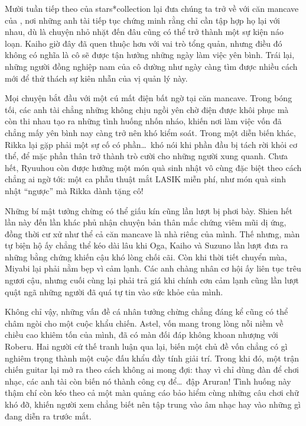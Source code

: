 \documentclass[main.tex]{subfiles}
\begin{document}
\color{black}

Mười tuần tiếp theo của stars*collection lại đưa chúng ta trở về với căn mancave của \hls, nơi những anh tài tiếp tục chứng minh rằng chỉ cần tập hợp họ lại với nhau, dù là chuyện nhỏ nhặt đến đâu cũng có thể trở thành một sự kiện náo loạn. Kaiho giờ đây đã quen thuộc hơn với vai trò tổng quản, nhưng điều đó không có nghĩa là cô sẽ được tận hưởng những ngày làm việc yên bình. Trái lại, những người đồng nghiệp nam của cô dường như ngày càng tìm được nhiều cách mới để thử thách sự kiên nhẫn của vị quản lý này.

Mọi chuyện bắt đầu với một cú mất điện bất ngờ tại căn mancave. Trong bóng tối, các anh tài chẳng những không chịu ngồi yên chờ điện được khôi phục mà còn thi nhau tạo ra những tình huống nhốn nháo, khiến nơi làm việc vốn đã chẳng mấy yên bình nay càng trở nên khó kiểm soát. Trong một diễn biến khác, Rikka lại gặp phải một sự cố có phần\dots\ khó nói khi phần đầu bị tách rời khỏi cơ thể, để mặc phần thân trở thành trò cười cho những người xung quanh. Chưa hết, Ryuuhou còn được hưởng một món quà sinh nhật vô cùng đặc biệt theo cách chẳng ai ngờ tới: một ca phẫu thuật mắt LASIK miễn phí, như món quà sinh nhật ``ngược'' mà Rikka dành tặng cô!

Những bí mật tưởng chừng có thể giấu kín cũng lần lượt bị phơi bày. Shien hết lần này đến lần khác phủ nhận chuyện bản thân mắc chứng viêm mũi dị ứng, đồng thời cư xử như thể cả căn mancave là nhà riêng của mình. Thế nhưng, màn tự biện hộ ấy chẳng thể kéo dài lâu khi Oga, Kaiho và Suzuno lần lượt đưa ra những bằng chứng khiến cậu khó lòng chối cãi. Còn khi thời tiết chuyển mùa, Miyabi lại phải nằm bẹp vì cảm lạnh. Các anh chàng nhân cơ hội ấy liên tục trêu ngươi cậu, nhưng cuối cùng lại phải trả giá khi chính cơn cảm lạnh cũng lần lượt quật ngã những người đã quá tự tin vào sức khỏe của mình.

Không chỉ vậy, những vấn đề cá nhân tưởng chừng chẳng đáng kể cũng có thể châm ngòi cho một cuộc khẩu chiến. Astel, vốn mang trong lòng nỗi niềm về chiều cao khiêm tốn của mình, đã có màn đối đáp không khoan nhượng với Roberu. Hai người cứ thế tranh luận qua lại, biến một chủ đề vốn chẳng có gì nghiêm trọng thành một cuộc đấu khẩu đầy tính giải trí. Trong khi đó, một trận chiến guitar lại mở ra theo cách không ai mong đợi: thay vì chỉ dùng đàn để chơi nhạc, các anh tài còn biến nó thành công cụ để\dots\ đập Aruran! Tình huống này thậm chí còn kéo theo cả một màn quảng cáo bảo hiểm cùng những câu chơi chữ khó đỡ, khiến người xem chẳng biết nên tập trung vào âm nhạc hay vào những gì đang diễn ra trước mắt.
\end{document}
